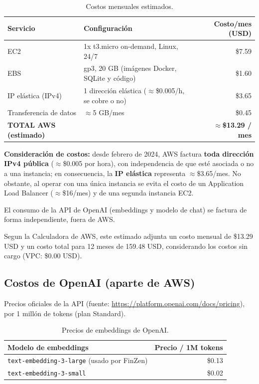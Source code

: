 \documentclass[12pt,letterpaper]{article}
\begin{document}
\begin{table}[H]
\centering
\small
\setlength{\tabcolsep}{4pt}
\begin{tabular}{l p{7cm} r}
\toprule
\textbf{Servicio} & \textbf{Configuraci\'on} & \textbf{Costo/mes (USD)} \\
\midrule
EC2 & 1x t3.micro on-demand, Linux, 24/7 & \$7.59 \\
EBS & gp3, 20 GB (im\'agenes Docker, SQLite y c\'odigo) & \$1.60 \\
IP el\'astica (IPv4) & 1 direcci\'on el\'astica ($\approx$\$0.005/h, se cobre o no) & \$3.65 \\
Transferencia de datos & $\approx$5 GB/mes & \$0.45 \\
\midrule
\textbf{TOTAL AWS (estimado)} & & \textbf{$\approx$\$13.29 / mes} \\
\bottomrule
\end{tabular}
\caption{Costos mensuales estimados.}
\end{table}

\textbf{Consideraci\'on de costos:} desde febrero de 2024, AWS factura \textbf{toda
direcci\'on IPv4 p\'ublica} ($\approx$\$0.005 por hora), con independencia de que est\'e
asociada o no a una instancia; en consecuencia, la \textbf{IP el\'astica} representa
$\approx$\$3.65/mes. No obstante, al operar con una \'unica instancia se evita el costo
de un Application Load Balancer ($\approx$\$16/mes) y de una segunda instancia EC2.

El consumo de la API de OpenAI (embeddings y modelo de chat) se factura de forma
independiente, fuera de AWS.

Segun la Calculadora de AWS, este estimado adjunta un costo mensual de \$13.29 USD
y un costo total para 12 meses de 159.48 USD, considerando los costos sin cargo
(VPC: \$0.00 USD).

\subsection{Costos de OpenAI (aparte de AWS)}
Precios oficiales de la API (fuente: \url{https://platform.openai.com/docs/pricing}),
por 1 millón de tokens (plan Standard).

\begin{table}[H]
\centering
\small
\begin{tabular}{l r}
\toprule
\textbf{Modelo de embeddings} & \textbf{Precio / 1M tokens} \\
\midrule
\texttt{text-embedding-3-large} (usado por FinZen) & \$0.13 \\
\texttt{text-embedding-3-small} & \$0.02 \\
\bottomrule
\end{tabular}
\caption{Precios de embeddings de OpenAI.}
\end{table}
\end{document}

